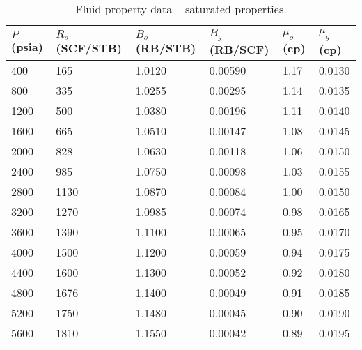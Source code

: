 \begin{table}[H]
  \centering
  \caption{Fluid property data -- saturated properties.}
  \footnotesize
  \label{tab:fluid_property_data}
  \begin{tabularx}{1.0\textwidth}{XXXXXX}
    \toprule
    $P$ {\tiny (psia)} & $R_s$ {\tiny (SCF/STB)} & $B_o$ {\tiny (RB/STB)} & $B_g$ {\tiny (RB/SCF)} & $\mu_o$ {\tiny (cp)} & $\mu_g$ {\tiny (cp)} \\
    \midrule
     400 &  165 & 1.0120 & 0.00590 & 1.17 & 0.0130 \\
     800 &  335 & 1.0255 & 0.00295 & 1.14 & 0.0135 \\
    1200 &  500 & 1.0380 & 0.00196 & 1.11 & 0.0140 \\
    1600 &  665 & 1.0510 & 0.00147 & 1.08 & 0.0145 \\
    2000 &  828 & 1.0630 & 0.00118 & 1.06 & 0.0150 \\
    2400 &  985 & 1.0750 & 0.00098 & 1.03 & 0.0155 \\
    2800 & 1130 & 1.0870 & 0.00084 & 1.00 & 0.0150 \\
    3200 & 1270 & 1.0985 & 0.00074 & 0.98 & 0.0165 \\
    3600 & 1390 & 1.1100 & 0.00065 & 0.95 & 0.0170 \\
    4000 & 1500 & 1.1200 & 0.00059 & 0.94 & 0.0175 \\
    4400 & 1600 & 1.1300 & 0.00052 & 0.92 & 0.0180 \\
    4800 & 1676 & 1.1400 & 0.00049 & 0.91 & 0.0185 \\
    5200 & 1750 & 1.1480 & 0.00045 & 0.90 & 0.0190 \\
    5600 & 1810 & 1.1550 & 0.00042 & 0.89 & 0.0195 \\
    \bottomrule
  \end{tabularx}
\end{table}

